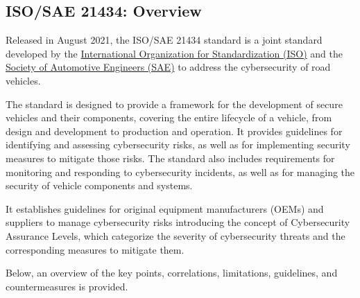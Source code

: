 \subsection{ISO/SAE 21434: Overview}\label{subsec:iso-sae-21434}

Released in August 2021, the ISO/SAE 21434 standard is a joint standard
developed by the \href{https://www.iso.org/home.html}{International Organization for Standardization (ISO)} and the
\href{https://www.sae.org/}{Society of Automotive Engineers (SAE)} to address the cybersecurity of road vehicles.

The standard is designed to provide a framework for the development of secure vehicles and their components,
covering the entire lifecycle of a vehicle, from design and development to production and operation.
It provides guidelines for identifying and assessing cybersecurity risks, as well as for implementing security measures to mitigate those risks.
The standard also includes requirements for monitoring and responding to cybersecurity incidents, as well as for managing the security of vehicle components and systems.

It establishes guidelines for original equipment manufacturers (OEMs) and suppliers to manage cybersecurity risks introducing the concept of Cybersecurity Assurance Levels,
which categorize the severity of cybersecurity threats and the corresponding measures to mitigate them\cite{moukahal2021towards,iso-correlation}.

Below, an overview of the key points, correlations, limitations, guidelines, and countermeasures is provided.

